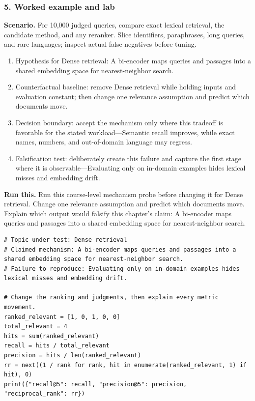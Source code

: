 \subsubsection*{5. Worked example and lab}
\textbf{Scenario.} For 10,000 judged queries, compare exact lexical retrieval, the candidate method, and any reranker. Slice identifiers, paraphrases, long queries, and rare languages; inspect actual false negatives before tuning.
\begin{enumerate}
\item Hypothesis for Dense retrieval: A bi-encoder maps queries and passages into a shared embedding space for nearest-neighbor search.
\item Counterfactual baseline: remove Dense retrieval while holding inputs and evaluation constant; then change one relevance assumption and predict which documents move.
\item Decision boundary: accept the mechanism only where this tradeoff is favorable for the stated workload—Semantic recall improves, while exact names, numbers, and out-of-domain language may regress.
\item Falsification test: deliberately create this failure and capture the first stage where it is observable—Evaluating only on in-domain examples hides lexical misses and embedding drift.
\end{enumerate}
\textbf{Run this.} Run this course-level mechanism probe before changing it for Dense retrieval. Change one relevance assumption and predict which documents move. Explain which output would falsify this chapter's claim: A bi-encoder maps queries and passages into a shared embedding space for nearest-neighbor search.
\begin{Verbatim}[fontsize=\scriptsize]
# Topic under test: Dense retrieval
# Claimed mechanism: A bi-encoder maps queries and passages into a shared embedding space for nearest-neighbor search.
# Failure to reproduce: Evaluating only on in-domain examples hides lexical misses and embedding drift.

# Change the ranking and judgments, then explain every metric movement.
ranked_relevant = [1, 0, 1, 0, 0]
total_relevant = 4
hits = sum(ranked_relevant)
recall = hits / total_relevant
precision = hits / len(ranked_relevant)
rr = next((1 / rank for rank, hit in enumerate(ranked_relevant, 1) if hit), 0)
print({"recall@5": recall, "precision@5": precision, "reciprocal_rank": rr})
\end{Verbatim}
